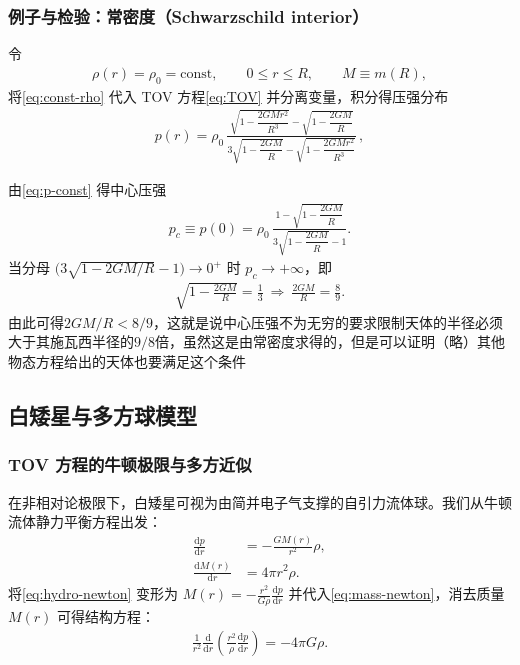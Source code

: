 \subsubsection{例子与检验：常密度（Schwarzschild interior）}
令
\begin{align}
\rho(r)=\rho_{0}=\text{const},\qquad 0\le r\le R,\qquad M\equiv m(R),\label{eq:const-rho}
\end{align}
将\eqref{eq:const-rho} 代入 TOV 方程\eqref{eq:TOV} 并分离变量，积分得压强分布
\begin{align}
p(r)=\rho_{0}\,
\frac{\sqrt{1-\dfrac{2GM r^{2}}{R^{3}}}-\sqrt{1-\dfrac{2GM}{R}}}
{3\sqrt{1-\dfrac{2GM}{R}}-\sqrt{1-\dfrac{2GM r^{2}}{R^{3}}}}\,,\label{eq:p-const}
\end{align}

由\eqref{eq:p-const} 得中心压强
\begin{align}
p_{c}\equiv p(0)=\rho_{0}\,\frac{1-\sqrt{1-\dfrac{2GM}{R}}}{3\sqrt{1-\dfrac{2GM}{R}}-1}.\label{eq:p-center}
\end{align}
当分母 $\bigl(3\sqrt{1-2GM/R}-1\bigr)\to0^{+}$ 时 $p_{c}\to+\infty$，即
\begin{align}
\sqrt{1-\frac{2GM}{R}}=\frac{1}{3}\ \Rightarrow\ \frac{2GM}{R}=\frac{8}{9}.\label{eq:buchdahl-bound}
\end{align}
由此可得$2GM/R<8/9$，这就是说中心压强不为无穷的要求限制天体的半径必须大于其施瓦西半径的$9/8$倍，虽然这是由常密度求得的，但是可以证明（略）其他物态方程给出的天体也要满足这个条件

\subsection{白矮星与多方球模型}

\subsubsection{TOV 方程的牛顿极限与多方近似}

在非相对论极限下，白矮星可视为由简并电子气支撑的自引力流体球。我们从牛顿流体静力平衡方程出发：
\begin{align}
\frac{\mathrm{d}p}{\mathrm{d}r} &= -\frac{G M(r)}{r^2}\rho, \label{eq:hydro-newton} \\
\frac{\mathrm{d}M(r)}{\mathrm{d}r} &= 4\pi r^2 \rho. \label{eq:mass-newton}
\end{align}
将\eqref{eq:hydro-newton} 变形为 $M(r) = -\frac{r^2}{G\rho}\frac{\mathrm{d}p}{\mathrm{d}r}$ 并代入\eqref{eq:mass-newton}，消去质量 $M(r)$ 可得结构方程：
\begin{align}
\frac{1}{r^2}\frac{\mathrm{d}}{\mathrm{d}r}\left(\frac{r^2}{\rho}\frac{\mathrm{d}p}{\mathrm{d}r}\right) = -4\pi G \rho. \label{eq:structure-diff}
\end{align}


